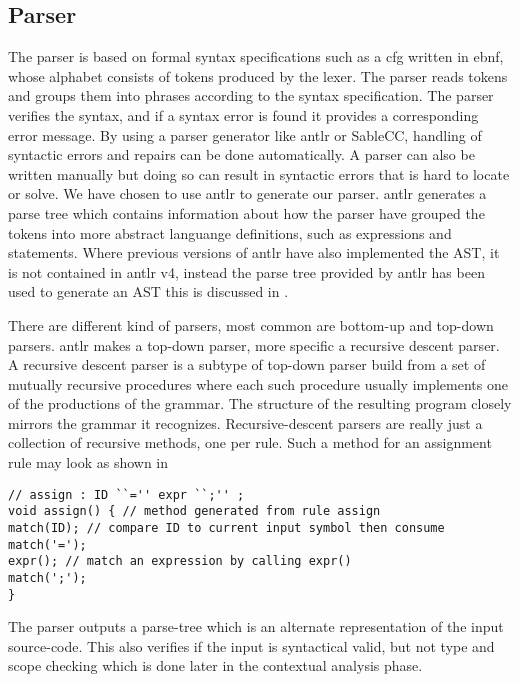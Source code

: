 \subsection*{Parser}\label{subsec:parser}
The parser is based on formal syntax specifications such as a \acrfull{cfg} written in \acrfull{ebnf}, whose alphabet consists of tokens produced by the lexer. 
The parser reads tokens and groups them into phrases according to the syntax specification.
The parser verifies the syntax, and if a syntax error is found it provides a corresponding error message. \citep{Crafting_book}
By using a parser generator like \acrshort{antlr} or SableCC, handling of syntactic errors and repairs can be done automatically.
A parser can also be written manually but doing so can result in syntactic errors that is hard to locate or solve.
We have chosen to use \acrshort{antlr} to generate our parser. 
\acrshort{antlr} generates a parse tree which contains information about how the parser have grouped the tokens into more abstract languange definitions, such as expressions and statements.
Where previous versions of \acrshort{antlr} have also implemented the AST, it is not contained in \acrshort{antlr} v4, instead the parse tree provided by \acrshort{antlr} has been used to generate an AST this is discussed in .

There are different kind of parsers, most common are bottom-up and top-down parsers.
\acrshort{antlr} makes a top-down parser, more specific a recursive descent parser.
A recursive descent parser is a subtype of top-down parser build from a set of mutually recursive procedures where each such procedure usually implements one of the productions of the grammar.
The structure of the resulting program closely mirrors the grammar it recognizes. \citep{Recursive_programming}
Recursive-descent parsers are really just a collection of recursive methods, one per rule.
Such a method for an assignment rule may look as shown in 
\begin{lstlisting}[caption=Example a recursive descent parser method,frame=tlrb,label={lst:rdpmethod}]
// assign : ID ``='' expr ``;'' ;
void assign() { // method generated from rule assign
match(ID); // compare ID to current input symbol then consume
match('=');
expr(); // match an expression by calling expr()
match(';');
}
\end{lstlisting}

The parser outputs a parse-tree which is an alternate representation of the input source-code. 
This also verifies if the input is syntactical valid, but not type and scope checking which is done later in the contextual analysis phase. 

